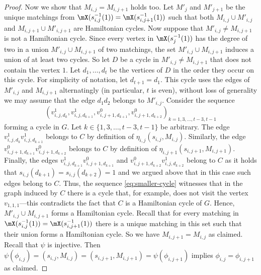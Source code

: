 \documentclass[a4paper,UKenglish,cleveref, autoref, thm-restate]{lipics-v2021}
\begin{document}
\begin{proof}
	Now we show that $M_{i,j} = M_{i,j+1}$ holds too.
	Let $M'_j$ and $M'_{j+1}$ be the unique matchings from $\mX(s^{-1}_{i,j}(1)) = \mX(s^{-1}_{i,j+1}(1))$ such that both $M_{i,j} \cup M'_{i,j}$ and $M_{i,j+1} \cup M'_{i,j+1}$ are Hamiltonian cycles.
	Now suppose that $M'_{i,j} \neq M_{i,j+1}$ is not a Hamiltonian cycle.
	Since every vertex in $\mX(s^{-1}_j(1))$ has the degree of two in a union $M'_{i,j} \cup M_{i,j+1}$ of two matchings, the set $M'_{i,j} \cup M_{i,j+1}$ induces a union of at least two cycles.
	So let $D$ be a cycle in $M'_{i,j} \neq M_{i,j+1}$ that does not contain the vertex $1$.
	Let $d_1, \dots, d_t$ be the vertices of $D$ in the order they occur on this cycle.
	For simplicity of notation, let $d_{t+1} = d_1$.
	This cycle uses the edges of $M'_{i,j}$ and $M_{i,j+1}$ alternatingly (in particular, $t$ is even), without loss of generality we may assume that the edge $d_1 d_2$ belongs to $M'_{i,j}$.
	Consider the sequence
	\begin{equation}\label{eq:smaller-cycle}
		(v_{i,j,d_k}^1, v_{i, j, d_{k+1}}^1, v_{i, j+1, d_{k+1}}^0, v_{i, j+1, d_{k+2}}^0)_{k = 1, 3, \dots, t - 3, t - 1} 
	\end{equation}
	forming a cycle in $G$.
	Let $k \in \{1, 3, \dots, t - 3, t - 1\}$ be arbitrary.
	The edge $v_{i,j,d_k}^1 v_{i, j, d_{k+1}}^1$ belongs to $C$ by definition of $\eta_{i,j}(s_{i,j}, M_{i,j})$.
	Similarly, the edge $v_{i, j+1, d_{k+1}}^0 v_{i, j+1, d_{k+2}}^0$ belongs to $C$ by definition of $\eta_{i,j+1}(s_{i,j+1}, M_{i,j+1})$. 
	Finally, the edges $v_{i, j, d_{k+1}}^1 v_{i, j+1, d_{k+1}}^0$ and $v_{i, j+1, d_{k+2}}^0 v_{i, j, d_{k+2}}^1$ belong to $C$ as it holds that $s_{i,j}(d_{k+1}) = s_{i,j}(d_{k+2}) = 1$ and we argued above that in this case such edges belong to $C$. 
	Thus, the sequence \eqref{eq:smaller-cycle} witnesses that in the graph induced by $C$ there is a cycle that, for example, does not visit the vertex $v_{1,1,1}$---this contradicts the fact that $C$ is a Hamiltonian cycle of $G$.
	Hence, $M'_{i,j} \cup M_{i,j+1}$ forms a Hamiltonian cycle.
	Recall that for every matching in $\mX(s_{i,j}^{-1}(1)) = \mX(s_{i,j+1}^{-1}(1))$ there is a unique matching in this set such that their union forms a Hamiltonian cycle.
	So we have $M_{i,j+1} = M_{i,j}$ as claimed.
	Recall that $\psi$ is injective.
	Then $\psi(\phi_{i,j}) = (s_{i,j}, M_{i,j}) = (s_{i,j+1}, M_{i,j+1}) = \psi(\phi_{i,j+1})$ implies $\phi_{i,j} = \phi_{i,j+1}$ as claimed.
	

\end{proof}
\end{document}
